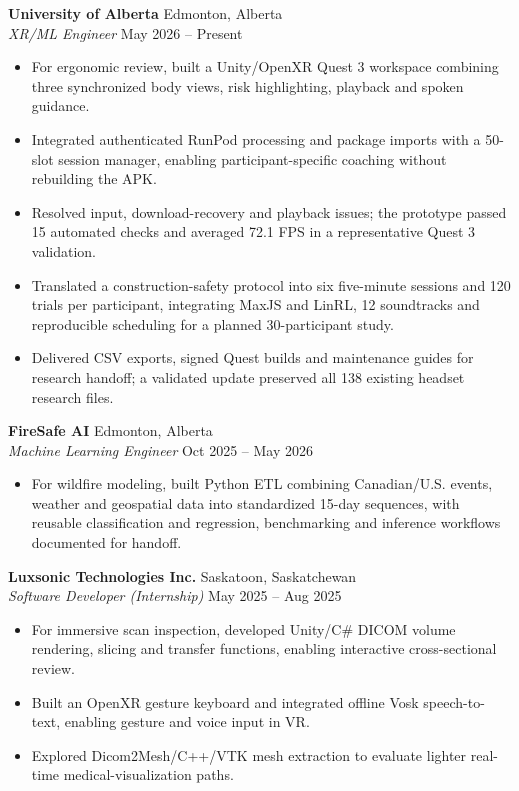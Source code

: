 \documentclass[10pt]{article}
\begin{document}
\textbf{University of Alberta}
\hfill Edmonton, Alberta\\
\textit{XR/ML Engineer}
\hfill May 2026 -- Present

\begin{itemize}
    \item For ergonomic review, built a Unity/OpenXR Quest 3 workspace combining three synchronized body views, risk highlighting, playback and spoken guidance.
    \item Integrated authenticated RunPod processing and package imports with a 50-slot session manager, enabling participant-specific coaching without rebuilding the APK.
    \item Resolved input, download-recovery and playback issues; the prototype passed 15 automated checks and averaged 72.1 FPS in a representative Quest 3 validation.
    \item Translated a construction-safety protocol into six five-minute sessions and 120 trials per participant, integrating MaxJS and LinRL, 12 soundtracks and reproducible scheduling for a planned 30-participant study.
    \item Delivered CSV exports, signed Quest builds and maintenance guides for research handoff; a validated update preserved all 138 existing headset research files.
\end{itemize}

\textbf{FireSafe AI}
\hfill Edmonton, Alberta\\
\textit{Machine Learning Engineer}
\hfill Oct 2025 -- May 2026

\begin{itemize}
    \item For wildfire modeling, built Python ETL combining Canadian/U.S. events, weather and geospatial data into standardized 15-day sequences, with reusable classification and regression, benchmarking and inference workflows documented for handoff.
\end{itemize}

\textbf{Luxsonic Technologies Inc.}
\hfill Saskatoon, Saskatchewan\\
\textit{Software Developer (Internship)}
\hfill May 2025 -- Aug 2025

\begin{itemize}
    \item For immersive scan inspection, developed Unity/C\# DICOM volume rendering, slicing and transfer functions, enabling interactive cross-sectional review.
    \item Built an OpenXR gesture keyboard and integrated offline Vosk speech-to-text, enabling gesture and voice input in VR.
    \item Explored Dicom2Mesh/C++/VTK mesh extraction to evaluate lighter real-time medical-visualization paths.
\end{itemize}
\end{document}
